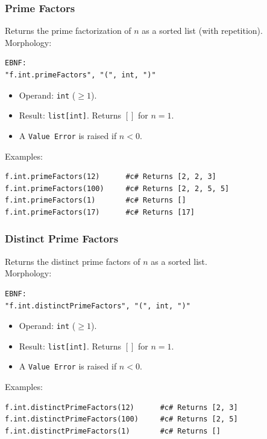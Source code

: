 \subsubsection{Prime Factors}
Returns the prime factorization of $n$ as a sorted list (with repetition). \\
Morphology:
\begin{verbatim}
EBNF:
"f.int.primeFactors", "(", int, ")"
\end{verbatim}
\begin{itemize}
\item Operand: \texttt{int} ($\geq 1$).
\item Result: \texttt{list[int]}. Returns $[]$ for $n = 1$.
\item A \texttt{Value Error} is raised if $n < 0$.
\end{itemize}
Examples:
\begin{verbatim}
f.int.primeFactors(12)      #c# Returns [2, 2, 3]
f.int.primeFactors(100)     #c# Returns [2, 2, 5, 5]
f.int.primeFactors(1)       #c# Returns []
f.int.primeFactors(17)      #c# Returns [17]
\end{verbatim}

\subsubsection{Distinct Prime Factors}
Returns the distinct prime factors of $n$ as a sorted list. \\
Morphology:
\begin{verbatim}
EBNF:
"f.int.distinctPrimeFactors", "(", int, ")"
\end{verbatim}
\begin{itemize}
\item Operand: \texttt{int} ($\geq 1$).
\item Result: \texttt{list[int]}. Returns $[]$ for $n = 1$.
\item A \texttt{Value Error} is raised if $n < 0$.
\end{itemize}
Examples:
\begin{verbatim}
f.int.distinctPrimeFactors(12)      #c# Returns [2, 3]
f.int.distinctPrimeFactors(100)     #c# Returns [2, 5]
f.int.distinctPrimeFactors(1)       #c# Returns []
\end{verbatim}

